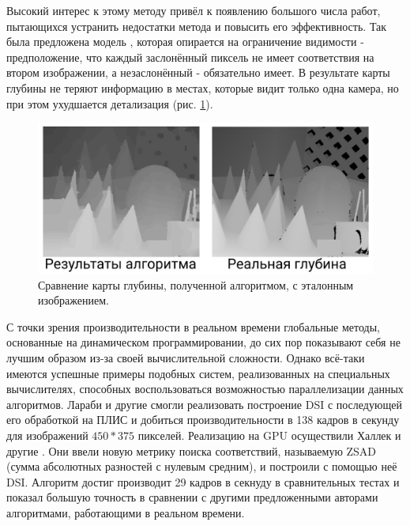 Высокий интерес к этому методу привёл к появлению большого числа работ, пытающихся устранить недостатки метода и повысить его эффективность. Так была предложена модель \cite{symmetric}, которая 
опирается на ограничение видимости - предположение, что каждый заслонённый пиксель не имеет соответствия на втором изображении, а незаслонённый - обязательно имеет. В результате карты глубины не теряют информацию 
в местах, которые видит только одна камера, но при этом ухудшается детализация (рис. \ref{pic:symmetry}). 
\begin{figure}[H]
	\begin{center}
		\includegraphics[scale=0.3]{pics/symmetric_rus.png}
		\caption{ Сравнение карты глубины, полученной алгоритмом, с эталонным изображением. } 
		\label{pic:symmetry} %
	\end{center}
\end{figure}

С точки зрения производительности в реальном времени глобальные методы, основанные на динамическом программировании, до сих пор показывают себя не лучшим образом из-за своей вычислительной сложности.
Однако всё-таки имеются успешные примеры подобных систем, реализованных на специальных вычислителях, способных воспользоваться возможностью параллелизации данных алгоритмов. Лараби и другие \cite{FPGA_DSI} 
смогли реализовать построение DSI с последующей его обработкой на ПЛИС и добиться производительности в 138 кадров в секунду для изображений $450*375$ пикселей. Реализацию на GPU осуществили Халлек и другие \cite{CUDA_DSI}. 
Они ввели новую метрику поиска соответствий, называемую ZSAD (сумма абсолютных разностей с нулевым средним), и построили с помощью неё DSI. Алгоритм достиг производит 29 кадров в секнуду в сравнительных тестах и 
показал большую точность в сравнении с другими предложенными авторами алгоритмами, работающими в реальном времени. 

